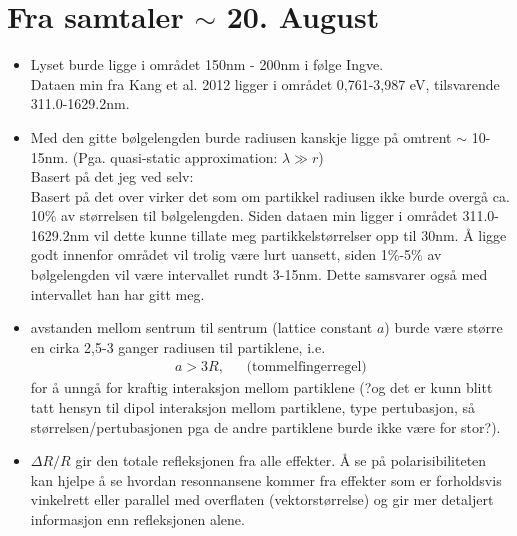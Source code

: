 \section{Fra samtaler $\sim$ 20. August}

\begin{itemize}
   \item 
   Lyset burde ligge i området 150nm - 200nm i følge Ingve.\\
   Dataen min fra Kang et al. 2012 ligger i området 0,761-3,987 eV, tilsvarende 311.0-1629.2nm.

   \item Med den gitte bølgelengden burde radiusen kanskje ligge på omtrent $\sim$ 10-15nm.
      (Pga. quasi-static approximation: $\lambda \gg r$) 
      \\
      Basert på det jeg ved selv:\\
      Basert på det over virker det som om partikkel radiusen
      ikke burde overgå ca. 10\% av størrelsen til bølgelengden. 
      Siden dataen min ligger i området 311.0-1629.2nm vil dette kunne tillate meg partikkelstørrelser
      opp til 30nm. Å ligge godt innenfor området vil trolig være lurt uansett, siden 1\%-5\% av bølgelengden
      vil være intervallet rundt 3-15nm. Dette samsvarer også med intervallet han har gitt meg.


   \item  avstanden mellom sentrum til sentrum (lattice constant $a$) burde være større en cirka
      2,5-3 ganger radiusen til partiklene, i.e.
      \begin{align}
         a > 3R, \:\:\:\:\:\:\: \text{(tommelfingerregel)}
      \end{align}
      for å unngå for kraftig interaksjon mellom partiklene (?og det er kunn blitt tatt hensyn til dipol
      interaksjon mellom partiklene, type pertubasjon, så størrelsen/pertubasjonen pga de andre
      partiklene burde ikke være for stor?).

    \item
       $\Delta R/R$ gir den totale refleksjonen fra alle effekter. Å se på polarisibiliteten
       kan hjelpe å se hvordan resonnansene kommer fra effekter som er forholdsvis vinkelrett eller
       parallel med overflaten (vektorstørrelse) og gir mer detaljert informasjon enn 
       refleksjonen alene.
\end{itemize}
